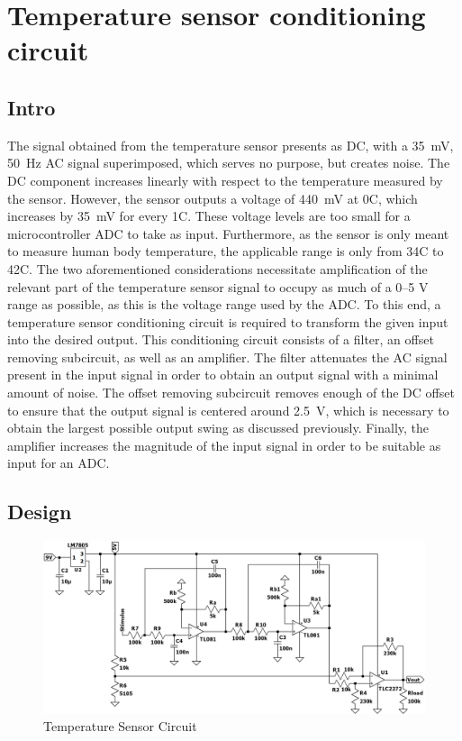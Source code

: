 \chapter{Temperature sensor conditioning circuit}\label{sec:temp_sensor}

\section{Intro} \label{sec:temp_intro}
The signal obtained from the temperature sensor presents as DC, with a \SI{35}{\milli \volt}, \SI{50}{Hz} AC signal superimposed, which serves no purpose, but creates noise. The DC component increases linearly with respect to the temperature measured by the sensor. However, the sensor outputs a voltage of \SI{440}{\milli \volt} at 0\degree C, which increases by \SI{35}{\milli \volt} for every 1\degree C. These voltage levels are too small for a microcontroller ADC to take as input. Furthermore, as the sensor is only meant to measure human body temperature, the applicable range is only from 34\degree C to 42\degree C. The two aforementioned considerations necessitate amplification of the relevant part of the temperature sensor signal to occupy as much of a \numrange{0}{5} \si{\volt} range as possible, as this is the voltage range used by the ADC.
To this end, a temperature sensor conditioning circuit is required to transform the given input into the desired output. This conditioning circuit consists of a filter, an offset removing subcircuit, as well as an amplifier. The filter attenuates the AC signal present in the input signal in order to obtain an output signal with a minimal amount of noise. The offset removing subcircuit removes enough of the DC offset to ensure that the output signal is centered around \SI{2.5}{\volt}, which is necessary to obtain the largest possible output swing as discussed previously. Finally, the amplifier increases the magnitude of the input signal in order to be suitable as input for an ADC.

\pagebreak

\section{Design}\label{sec:temp_design}
\begin{figure}[h]
    \centering
    \includegraphics[width = 1\textwidth]{Figures/final.png}
    \caption{Temperature Sensor Circuit}
    \label{fig:final}
\end{figure}


